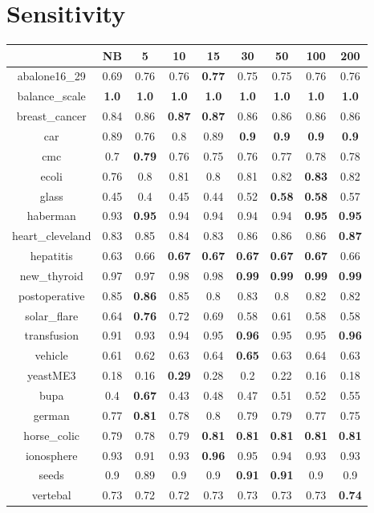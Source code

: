 \documentclass{article}%
\begin{document}
%
\section*{Sensitivity}%
\begin{tabular}{c|cccccccc}%
\hline%
&NB&5&10&15&30&50&100&200\\%
\hline%
abalone16\_29&0.69&0.76&0.76&\textbf{0.77}&0.75&0.75&0.76&0.76\\%
\hline%
balance\_scale&\textbf{1.0}&\textbf{1.0}&\textbf{1.0}&\textbf{1.0}&\textbf{1.0}&\textbf{1.0}&\textbf{1.0}&\textbf{1.0}\\%
\hline%
breast\_cancer&0.84&0.86&\textbf{0.87}&\textbf{0.87}&0.86&0.86&0.86&0.86\\%
\hline%
car&0.89&0.76&0.8&0.89&\textbf{0.9}&\textbf{0.9}&\textbf{0.9}&\textbf{0.9}\\%
\hline%
cmc&0.7&\textbf{0.79}&0.76&0.75&0.76&0.77&0.78&0.78\\%
\hline%
ecoli&0.76&0.8&0.81&0.8&0.81&0.82&\textbf{0.83}&0.82\\%
\hline%
glass&0.45&0.4&0.45&0.44&0.52&\textbf{0.58}&\textbf{0.58}&0.57\\%
\hline%
haberman&0.93&\textbf{0.95}&0.94&0.94&0.94&0.94&\textbf{0.95}&\textbf{0.95}\\%
\hline%
heart\_cleveland&0.83&0.85&0.84&0.83&0.86&0.86&0.86&\textbf{0.87}\\%
\hline%
hepatitis&0.63&0.66&\textbf{0.67}&\textbf{0.67}&\textbf{0.67}&\textbf{0.67}&\textbf{0.67}&0.66\\%
\hline%
new\_thyroid&0.97&0.97&0.98&0.98&\textbf{0.99}&\textbf{0.99}&\textbf{0.99}&\textbf{0.99}\\%
\hline%
postoperative&0.85&\textbf{0.86}&0.85&0.8&0.83&0.8&0.82&0.82\\%
\hline%
solar\_flare&0.64&\textbf{0.76}&0.72&0.69&0.58&0.61&0.58&0.58\\%
\hline%
transfusion&0.91&0.93&0.94&0.95&\textbf{0.96}&0.95&0.95&\textbf{0.96}\\%
\hline%
vehicle&0.61&0.62&0.63&0.64&\textbf{0.65}&0.63&0.64&0.63\\%
\hline%
yeastME3&0.18&0.16&\textbf{0.29}&0.28&0.2&0.22&0.16&0.18\\%
\hline%
bupa&0.4&\textbf{0.67}&0.43&0.48&0.47&0.51&0.52&0.55\\%
\hline%
german&0.77&\textbf{0.81}&0.78&0.8&0.79&0.79&0.77&0.75\\%
\hline%
horse\_colic&0.79&0.78&0.79&\textbf{0.81}&\textbf{0.81}&\textbf{0.81}&\textbf{0.81}&\textbf{0.81}\\%
\hline%
ionosphere&0.93&0.91&0.93&\textbf{0.96}&0.95&0.94&0.93&0.93\\%
\hline%
seeds&0.9&0.89&0.9&0.9&\textbf{0.91}&\textbf{0.91}&0.9&0.9\\%
\hline%
vertebal&0.73&0.72&0.72&0.73&0.73&0.73&0.73&\textbf{0.74}\\%
\hline%
\end{tabular}
\end{document}
